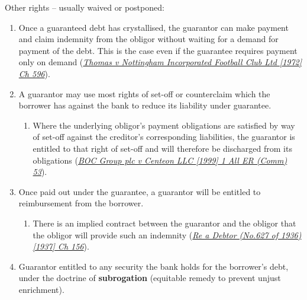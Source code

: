 \documentclass[
]{article}
\providecommand{\tightlist}{%
  \setlength{\itemsep}{0pt}\setlength{\parskip}{0pt}}
\begin{document}
Other rights -- usually waived or postponed:

\begin{enumerate}
\tightlist
\item
  Once a guaranteed debt has crystallised, the guarantor can make
  payment and claim indemnity from the obligor without waiting for a
  demand for payment of the debt. This is the case even if the guarantee
  requires payment only on demand
  (\emph{\href{https://uk.westlaw.com/D-000-5038?originationContext=document\&transitionType=PLDocumentLink\&contextData=(sc.Default)\&ppcid=9fc18fbc2d79468f9bd5272f7e22e9db}{Thomas
  v Nottingham Incorporated Football Club Ltd {[}1972{]} Ch 596}}).
\item
  A guarantor may use most rights of set-off or counterclaim which the
  borrower has against the bank to reduce its liability under guarantee.

  \begin{enumerate}
  \tightlist
  \item
    Where the underlying obligor's payment obligations are satisfied by
    way of set-off against the creditor's corresponding liabilities, the
    guarantor is entitled to that right of set-off and will therefore be
    discharged from its obligations
    (\emph{\href{https://uk.westlaw.com/D-000-4199?originationContext=document\&transitionType=PLDocumentLink\&contextData=(sc.Default)\&ppcid=9fc18fbc2d79468f9bd5272f7e22e9db}{BOC
    Group plc v Centeon LLC {[}1999{]} 1 All ER (Comm) 53}}).
  \end{enumerate}
\item
  Once paid out under the guarantee, a guarantor will be entitled to
  reimbursement from the borrower.

  \begin{enumerate}
  \tightlist
  \item
    There is an implied contract between the guarantor and the obligor
    that the obligor will provide such an indemnity
    (\emph{\href{https://uk.westlaw.com/D-000-5037?originationContext=document\&transitionType=PLDocumentLink\&contextData=(sc.Default)\&ppcid=31b1b10b11a346b28acbfa5d800fec19}{Re
    a Debtor (No.627 of 1936) {[}1937{]} Ch 156}}).
  \end{enumerate}
\item
  Guarantor entitled to any security the bank holds for the borrower's
  debt, under the doctrine of \textbf{subrogation} (equitable remedy to
  prevent unjust enrichment).


\end{enumerate}
\end{document}
